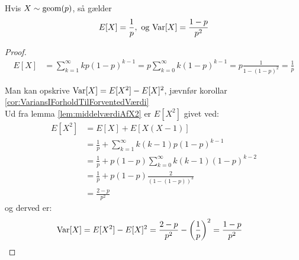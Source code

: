 \begin{prop} %
\label{prop:geomEgenskaber}
Hvis $X \sim \textnormal{geom} (p)$, så gælder 
\begin{align*}
    E[X] = \frac{1}{p}, \text{ og } \textnormal{Var}[X] = \frac{1-p}{p^2}
\end{align*}
\end{prop}

\begin{proof}
\begin{align*}
    E[X]&=\sum_{k=1}^\infty kp(1-p)^{k-1} =p\sum_{k=0}^\infty k(1-p)^{k-1}=p\frac{1}{1-(1-p)^2}=\frac{1}{p}
\end{align*}

Man kan opskrive $\textnormal{Var}[X] =E[X^2]-E[X]^2$, jævnfør korollar \ref{cor:VariansIForholdTilForventedVærdi}\\
Ud fra lemma \ref{lem:middelværdiAfX2} er $E[X^2]$ givet ved:
\begin{align*}
E[X^2]&=E[X]+E[X(X-1)]\\
    &=\frac{1}{p}+\sum_{k=1}^{\infty}k(k-1)p(1-p)^{k-1}\\
    &=\frac{1}{p} + p(1-p)\sum_{k=0}^{\infty}k(k-1)(1-p)^{k-2}\\
    &=\frac{1}{p}+p(1-p)\frac{2}{(1-(1-p))^3}\\
    &=\frac{2-p}{p^2}
\end{align*}
og derved er:
\begin{align*}
     \textnormal{Var}[X]&=E[X^2]-E[X]^2
     =\frac{2-p}{p^2}-\left(\frac{1}{p}\right)^2=\frac{1-p}{p^2}
\end{align*}
\end{proof}


